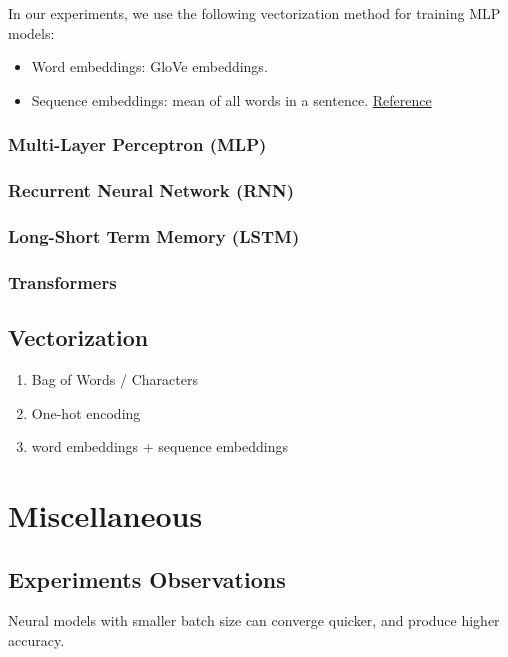 \documentclass[12pt, a4paper]{article}
\begin{document}
In our experiments, we use the following vectorization method for training MLP models:
\begin{itemize}
	\item Word embeddings: GloVe embeddings.
	\item Sequence embeddings: mean of all words in a sentence. \href{https://edumunozsala.github.io/BlogEms/jupyter/nlp/classification/embeddings/python/2020/08/15/Intro_NLP_WordEmbeddings_Classification.html}{Reference}
\end{itemize}

\subsubsection{Multi-Layer Perceptron (MLP)}

\subsubsection{Recurrent Neural Network (RNN)}

\subsubsection{Long-Short Term Memory (LSTM)}

\subsubsection{Transformers}

\subsection{Vectorization}

\begin{enumerate}
	\item Bag of Words / Characters
	\item One-hot encoding
	\item word embeddings + sequence embeddings
\end{enumerate}

\section{Miscellaneous}

\subsection{Experiments Observations}

Neural models with smaller batch size can converge quicker, and produce higher accuracy.
\end{document}
